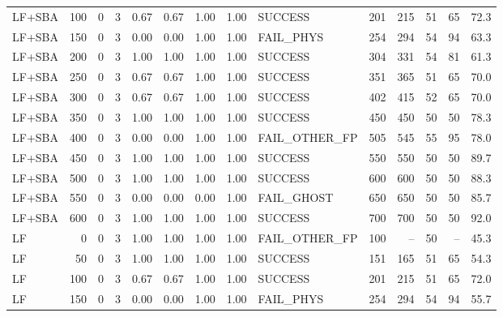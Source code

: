 \begin{tabular}{lrrr|rrrr|lrr|rr|r}
  LF+SBA                         &  100 &    0 &   3 & 0.67 & 0.67 & 1.00 & 1.00 & SUCCESS         &   201 &   215 &    51 &    65 &  72.3 \\
  LF+SBA                         &  150 &    0 &   3 & 0.00 & 0.00 & 1.00 & 1.00 & FAIL_PHYS       &   254 &   294 &    54 &    94 &  63.3 \\
  LF+SBA                         &  200 &    0 &   3 & 1.00 & 1.00 & 1.00 & 1.00 & SUCCESS         &   304 &   331 &    54 &    81 &  61.3 \\
  LF+SBA                         &  250 &    0 &   3 & 0.67 & 0.67 & 1.00 & 1.00 & SUCCESS         &   351 &   365 &    51 &    65 &  70.0 \\
  LF+SBA                         &  300 &    0 &   3 & 0.67 & 0.67 & 1.00 & 1.00 & SUCCESS         &   402 &   415 &    52 &    65 &  70.0 \\
  LF+SBA                         &  350 &    0 &   3 & 1.00 & 1.00 & 1.00 & 1.00 & SUCCESS         &   450 &   450 &    50 &    50 &  78.3 \\
  LF+SBA                         &  400 &    0 &   3 & 0.00 & 0.00 & 1.00 & 1.00 & FAIL_OTHER_FP   &   505 &   545 &    55 &    95 &  78.0 \\
  LF+SBA                         &  450 &    0 &   3 & 1.00 & 1.00 & 1.00 & 1.00 & SUCCESS         &   550 &   550 &    50 &    50 &  89.7 \\
  LF+SBA                         &  500 &    0 &   3 & 1.00 & 1.00 & 1.00 & 1.00 & SUCCESS         &   600 &   600 &    50 &    50 &  88.3 \\
  LF+SBA                         &  550 &    0 &   3 & 0.00 & 0.00 & 0.00 & 1.00 & FAIL_GHOST      &   650 &   650 &    50 &    50 &  85.7 \\
  LF+SBA                         &  600 &    0 &   3 & 1.00 & 1.00 & 1.00 & 1.00 & SUCCESS         &   700 &   700 &    50 &    50 &  92.0 \\
  LF                             &    0 &    0 &   3 & 1.00 & 1.00 & 1.00 & 1.00 & FAIL_OTHER_FP   &   100 &    -- &    50 &    -- &  45.3 \\
  LF                             &   50 &    0 &   3 & 1.00 & 1.00 & 1.00 & 1.00 & SUCCESS         &   151 &   165 &    51 &    65 &  54.3 \\
  LF                             &  100 &    0 &   3 & 0.67 & 0.67 & 1.00 & 1.00 & SUCCESS         &   201 &   215 &    51 &    65 &  72.0 \\
  LF                             &  150 &    0 &   3 & 0.00 & 0.00 & 1.00 & 1.00 & FAIL_PHYS       &   254 &   294 &    54 &    94 &  55.7 \\

\end{tabular}
